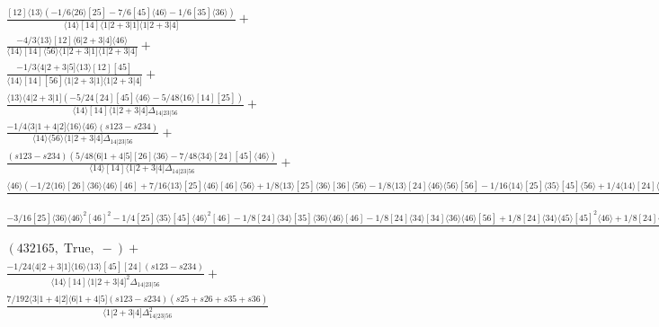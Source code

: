 \documentclass[varwidth, border=5pt]{standalone}
\begin{document}
\begin{my}
$\begin{gathered}
\scriptscriptstyle\frac{[12]⟨13⟩(-1/6⟨26⟩[25]-7/6[45]⟨46⟩-1/6[35]⟨36⟩)}{⟨14⟩[14]⟨1|2+3|1]⟨1|2+3|4]}+\\
\scriptscriptstyle\frac{-4/3⟨13⟩[12]⟨6|2+3|4]⟨46⟩}{⟨14⟩[14]⟨56⟩⟨1|2+3|1]⟨1|2+3|4]}+\\
\scriptscriptstyle\frac{-1/3⟨4|2+3|5]⟨13⟩[12][45]}{⟨14⟩[14][56]⟨1|2+3|1]⟨1|2+3|4]}+\\
\scriptscriptstyle\frac{⟨13⟩⟨4|2+3|1](-5/24[24][45]⟨46⟩-5/48⟨16⟩[14][25])}{⟨14⟩[14]⟨1|2+3|4]Δ_{14|23|56}}+\\
\scriptscriptstyle\frac{-1/4⟨3|1+4|2]⟨16⟩⟨46⟩(s123-s234)}{⟨14⟩⟨56⟩⟨1|2+3|4]Δ_{14|23|56}}+\\
\scriptscriptstyle\frac{(s123-s234)(5/48⟨6|1+4|5][26]⟨36⟩-7/48⟨34⟩[24][45]⟨46⟩)}{⟨14⟩[14]⟨1|2+3|4]Δ_{14|23|56}}+\\
\scriptscriptstyle\frac{⟨46⟩(-1/2⟨16⟩[26]⟨36⟩⟨46⟩[46]+7/16⟨13⟩[25]⟨46⟩[46]⟨56⟩+1/8⟨13⟩[25]⟨36⟩[36]⟨56⟩-1/8⟨13⟩[24]⟨46⟩⟨56⟩[56]-1/16⟨14⟩[25]⟨35⟩[45]⟨56⟩+1/4⟨14⟩[24]⟨34⟩[45]⟨56⟩-1/2⟨15⟩[25]⟨35⟩[45]⟨46⟩+1/8⟨13⟩[25]⟨35⟩[35]⟨56⟩+1/8⟨16⟩[26]⟨36⟩⟨56⟩[56]+1/2⟨15⟩[24]⟨36⟩⟨46⟩[56]+1/8⟨15⟩[25]⟨36⟩⟨56⟩[56]+1/16⟨13⟩[25]⟨45⟩[45]⟨56⟩-1/16⟨14⟩[25]⟨36⟩[46]⟨56⟩-1⟨15⟩[25]⟨36⟩⟨46⟩[46])}{⟨14⟩⟨56⟩⟨1|2+3|4]Δ_{14|23|56}}+\\
\scriptscriptstyle\frac{-3/16[25]⟨36⟩⟨46⟩^2[46]^2-1/4[25]⟨35⟩[45]⟨46⟩^2[46]-1/8[24]⟨34⟩[35]⟨36⟩⟨46⟩[46]-1/8[24]⟨34⟩[34]⟨36⟩⟨46⟩[56]+1/8[24]⟨34⟩⟨45⟩[45]^2⟨46⟩+1/8[24]⟨34⟩⟨35⟩[35]^2⟨36⟩+1/8[24]⟨34⟩⟨35⟩[35][45]⟨46⟩+1/8⟨24⟩[24]^2⟨34⟩[45]⟨46⟩+1/8⟨23⟩[24][25]⟨45⟩[45]⟨46⟩+1/8⟨23⟩⟨24⟩[24]^2[25]⟨46⟩+1/8[25]⟨35⟩^2[35][45]⟨46⟩+1/16⟨24⟩^2[24]^2[25]⟨36⟩-1/16[25]⟨26⟩^2[26]^2⟨36⟩+1/4[24]⟨34⟩^2[34][45]⟨46⟩}{⟨14⟩[14]⟨1|2+3|4]Δ_{14|23|56}}+\\
\scriptscriptstyle(432165,\;\text{True},\;-)+\\
\scriptscriptstyle\frac{-1/24⟨4|2+3|1]⟨16⟩⟨13⟩[45][24](s123-s234)}{⟨14⟩[14]⟨1|2+3|4]^2Δ_{14|23|56}}+\\
\scriptscriptstyle\frac{7/192⟨3|1+4|2]⟨6|1+4|5](s123-s234)(s25+s26+s35+s36)}{⟨1|2+3|4]Δ_{14|23|56}^2}\phantom{+}
\end{gathered}$
\end{my}
\end{document}
